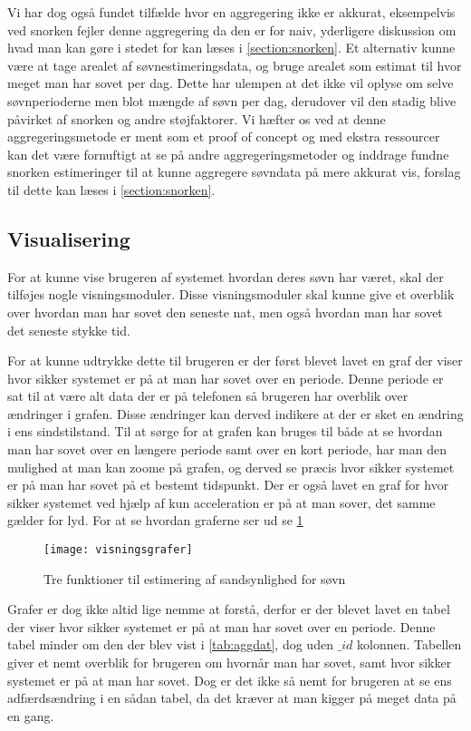 Vi har dog også fundet tilfælde hvor en aggregering ikke er akkurat, eksempelvis ved snorken fejler denne aggregering da den er for naiv, yderligere diskussion om hvad man kan gøre i stedet for kan læses i \cref{section:snorken}.
Et alternativ kunne være at tage arealet af søvnestimeringsdata, og bruge arealet som estimat til hvor meget man har sovet per dag.
Dette har ulempen at det ikke vil oplyse om selve søvnperioderne men blot mængde af søvn per dag, derudover vil den stadig blive påvirket af snorken og andre støjfaktorer.
Vi hæfter os ved at denne aggregeringsmetode er ment som et proof of concept og med ekstra ressourcer kan det være fornuftigt at se på andre aggregeringsmetoder og inddrage fundne snorken estimeringer til at kunne aggregere søvndata på mere akkurat vis, forslag til dette kan læses i \cref{section:snorken}.

\subsection{Visualisering}\label{sec:pocVis}
For at kunne vise brugeren af systemet hvordan deres søvn har været, skal der tilføjes nogle visningsmoduler.
Disse visningsmoduler skal kunne give et overblik over hvordan man har sovet den seneste nat, men også hvordan man har sovet det seneste stykke tid.

For at kunne udtrykke dette til brugeren er der først blevet lavet en graf der viser hvor sikker systemet er på at man har sovet over en periode.
Denne periode er sat til at være alt data der er på telefonen så brugeren har overblik over ændringer i grafen.
Disse ændringer kan derved indikere at der er sket en ændring i ens sindstilstand.
Til at sørge for at grafen kan bruges til både at se hvordan man har sovet over en længere periode samt over en kort periode, har man den mulighed at man kan zoome på grafen, og derved se præcis hvor sikker systemet er på man har sovet på et bestemt tidspunkt.
Der er også lavet en graf for hvor sikker systemet ved hjælp af kun acceleration er på at man sover, det samme gælder for lyd.
For at se hvordan graferne ser ud se \cref{fig:visningsgrafer}

\begin{figure}[h]
	\centering
	\texttt{[image: visningsgrafer]}
	\caption{Tre funktioner til estimering af sandsynlighed for søvn}\label{fig:visningsgrafer}
\end{figure}

Grafer er dog ikke altid lige nemme at forstå, derfor er der blevet lavet en tabel der viser hvor sikker systemet er på at man har sovet over en periode.
Denne tabel minder om den der blev vist i \cref{tab:aggdat}, dog uden $\_id$ kolonnen.
Tabellen giver et nemt overblik for brugeren om hvornår man har sovet, samt hvor sikker systemet er på at man har sovet.
Dog er det ikke så nemt for brugeren at se ens adfærdsændring i en sådan tabel, da det kræver at man kigger på meget data på en gang.
